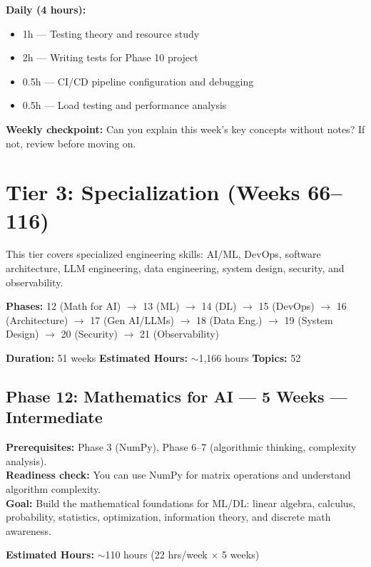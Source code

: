 \documentclass[11pt, a4paper, oneside]{report}
\begin{document}
\begin{practicebox}
\textbf{Daily (4 hours):}
\begin{itemize}[leftmargin=*]
\item 1h --- Testing theory and resource study
\item 2h --- Writing tests for Phase 10 project
\item 0.5h --- CI/CD pipeline configuration and debugging
\item 0.5h --- Load testing and performance analysis
\end{itemize}


\textbf{Weekly checkpoint:} Can you explain this week's key concepts without notes? If not, review before moving on.
\end{practicebox}


\chapter[Tier 3: Specialization]{Tier 3: Specialization (Weeks 66--116)}

\begin{tieroverviewbox}[title={\textbf{Tier Overview}}]
This tier covers specialized engineering skills: AI/ML, DevOps, software architecture, LLM engineering, data engineering, system design, security, and observability.

\textbf{Phases:} 12 (Math for AI) $\to$ 13 (ML) $\to$ 14 (DL) $\to$ 15 (DevOps) $\to$ 16 (Architecture) $\to$ 17 (Gen AI/LLMs) $\to$ 18 (Data Eng.) $\to$ 19 (System Design) $\to$ 20 (Security) $\to$ 21 (Observability)

\textbf{Duration:} 51 weeks \quad \textbf{Estimated Hours:} $\sim$1,166 hours \quad \textbf{Topics:} 52
\end{tieroverviewbox}
\clearpage
\section[Phase 12: Math for AI]{Phase 12: Mathematics for AI --- 5 Weeks --- Intermediate}

\begin{prereqbox}
\textbf{Prerequisites:} Phase 3 (NumPy), Phase 6--7 (algorithmic thinking, complexity analysis).\\
\textbf{Readiness check:} You can use NumPy for matrix operations and understand algorithm complexity.\\
\textbf{Goal:} Build the mathematical foundations for ML/DL: linear algebra, calculus, probability, statistics, optimization, information theory, and discrete math awareness.


\textbf{Estimated Hours:} $\sim$110 hours (22 hrs/week $\times$ 5 weeks)
\end{prereqbox}
\end{document}
